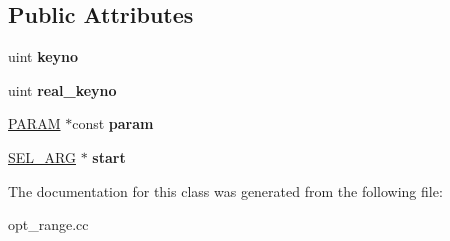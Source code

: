 \subsection*{Public Attributes}
\begin{DoxyCompactItemize}
\item 
\mbox{\label{classSel__arg__range__sequence_a9f2cfe639bd9872e4eae095ba2956b85}} 
uint {\bfseries keyno}
\item 
\mbox{\label{classSel__arg__range__sequence_a9e56ad598f63493677ce69934bd9a66a}} 
uint {\bfseries real\+\_\+keyno}
\item 
\mbox{\label{classSel__arg__range__sequence_a35a12d438ce1ddc7d4e0234c6de0247c}} 
\mbox{\hyperlink{classPARAM}{P\+A\+R\+AM}} $\ast$const {\bfseries param}
\item 
\mbox{\label{classSel__arg__range__sequence_ab21da4511d1a4fdc842b5830907236ce}} 
\mbox{\hyperlink{classSEL__ARG}{S\+E\+L\+\_\+\+A\+RG}} $\ast$ {\bfseries start}
\end{DoxyCompactItemize}


The documentation for this class was generated from the following file\+:\begin{DoxyCompactItemize}
\item 
opt\+\_\+range.\+cc\end{DoxyCompactItemize}
